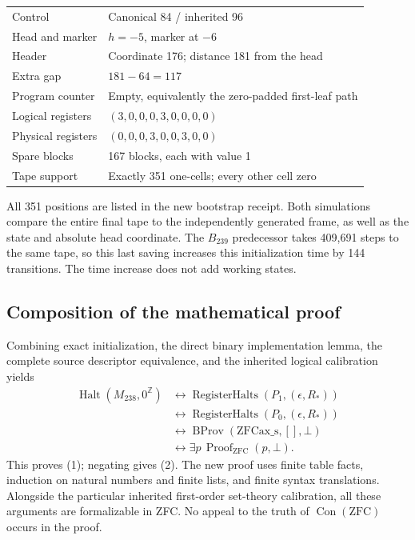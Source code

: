 \documentclass[11pt]{article}
\theoremstyle{definition}\newtheorem{definition}[theorem]{Definition}
\newcommand{\Con}{\operatorname{Con}}
\newcommand{\Halt}{\operatorname{Halt}}
\newcommand{\RHalt}{\operatorname{RegisterHalts}}
\newcommand{\ZFC}{\mathrm{ZFC}}
\begin{document}
\begin{center}
\begin{tabular}{ll}
\toprule
Control & Canonical 84 / inherited 96\\
Head and marker & $h=-5$, marker at $-6$\\
Header & Coordinate 176; distance 181 from the head\\
Extra gap & $181-64=117$\\
Program counter & Empty, equivalently the zero-padded first-leaf path\\
Logical registers & $(3,0,0,0,3,0,0,0,0)$\\
Physical registers & $(0,0,0,3,0,0,3,0,0)$\\
Spare blocks & 167 blocks, each with value 1\\
Tape support & Exactly 351 one-cells; every other cell zero\\
\bottomrule
\end{tabular}
\end{center}

All 351 positions are listed in the new bootstrap receipt.  Both simulations
compare the entire final tape to the independently generated frame, as
well as the state and absolute head coordinate.  The $B_{239}$ predecessor
takes 409,691 steps to the same tape, so this last saving increases this
initialization time by 144 transitions.  The time increase does not add
working states.

\subsection{Composition of the mathematical proof}

Combining exact initialization, the direct binary implementation lemma,
the complete source descriptor equivalence, and the inherited logical
calibration yields
\begin{align*}
 \Halt(M_{238},0^{\mathbb Z})
 &\longleftrightarrow \RHalt(P_1,(\epsilon,R_*))\\
 &\longleftrightarrow \RHalt(P_0,(\epsilon,R_*))\\
 &\longleftrightarrow \operatorname{BProv}(\mathrm{ZFCax\_s},[],\bot)\\
 &\longleftrightarrow \exists p\,\operatorname{Proof}_{\ZFC}(p,\bot).
\end{align*}
This proves (1); negating gives (2).  The new proof uses finite table
facts, induction on natural numbers and finite lists, and finite syntax
translations.  Alongside the particular inherited first-order set-theory
calibration, all these arguments are formalizable in ZFC.  No appeal to
the truth of $\Con(\ZFC)$ occurs in the proof.
\end{document}
